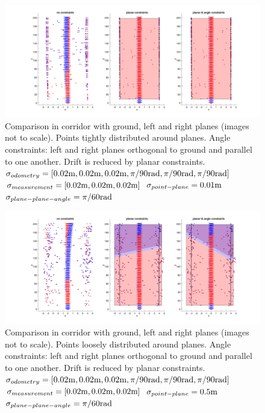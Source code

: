 \documentclass[a4paper,11pt]{article}
\begin{document}
\begin{figure}
\centering
\includegraphics[width=1.15\textwidth,trim={3cm 0 0 0},clip]{corridorLowNoise.png}
\caption{\label{fig:corridorLowNoise} Comparison in corridor with ground, left and right planes (images not to scale). Points tightly distributed around planes. Angle constraints: left and right planes orthogonal to ground and parallel to one another. Drift is reduced by planar constraints.\newline
$\sigma_{odometry} = [0.02\textnormal{m},0.02\textnormal{m},0.02\textnormal{m},
\pi/90\textnormal{rad},\pi/90\textnormal{rad},\pi/90\textnormal{rad}]$\newline
$\sigma_{measurement} = [0.02\textnormal{m},0.02\textnormal{m},0.02\textnormal{m}]$\newline
$\sigma_{point-plane} = 0.01\textnormal{m}$\newline
$\sigma_{plane-plane-angle} = \pi/60\textnormal{rad}$}
\end{figure}

\begin{figure}
\centering
\includegraphics[width=1.15\textwidth,trim={3cm 0 0 0},clip]{corridorHighNoise.png}
\caption{\label{fig:corridorHighNoise} Comparison in corridor with ground, left and right planes (images not to scale). Points loosely distributed around planes. Angle constraints: left and right planes orthogonal to ground and parallel to one another. Drift is reduced by planar constraints.\newline
$\sigma_{odometry} = [0.02\textnormal{m},0.02\textnormal{m},0.02\textnormal{m},
\pi/90\textnormal{rad},\pi/90\textnormal{rad},\pi/90\textnormal{rad}]$\newline
$\sigma_{measurement} = [0.02\textnormal{m},0.02\textnormal{m},0.02\textnormal{m}]$\newline
$\sigma_{point-plane} = 0.5\textnormal{m}$\newline
$\sigma_{plane-plane-angle} = \pi/60\textnormal{rad}$}
\end{figure}
\end{document}
